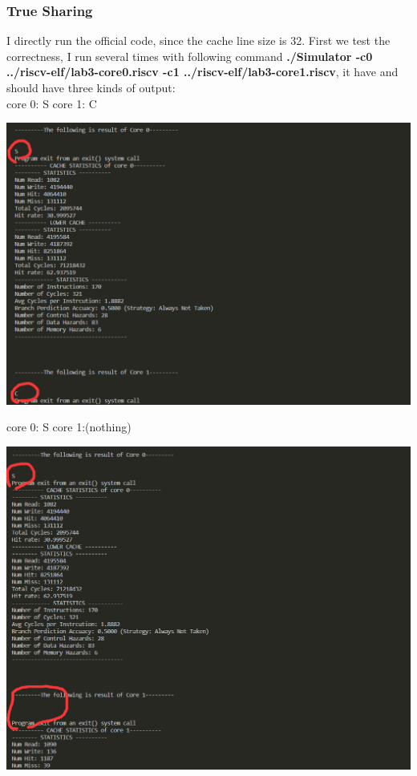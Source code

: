 \mathbb{R} \documentclass{article}
\begin{document}
\subsubsection{True Sharing}
I directly run the official code, since the cache line size is 32.
First we test the correctness, I run several times with following command \textbf{./Simulator -c0 ../riscv-elf/lab3-core0.riscv -c1 ../riscv-elf/lab3-core1.riscv}, it have and should have three kinds of output:\\
core 0: S   core 1: C  
\begin{center}
  \includegraphics[scale = 0.2]{8.png}
\end{center}
core 0: S   core 1:(nothing)
\begin{center}
  \includegraphics[scale = 0.2]{9.png}
\end{center}
\end{document}

